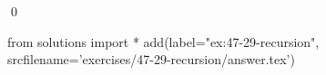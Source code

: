 
\begin{ex}
  \label{ex:47-29-recursion}
  
  \qed
\end{ex}
\begin{python0}
from solutions import *
add(label="ex:47-29-recursion",
    srcfilename='exercises/47-29-recursion/answer.tex')
\end{python0}
